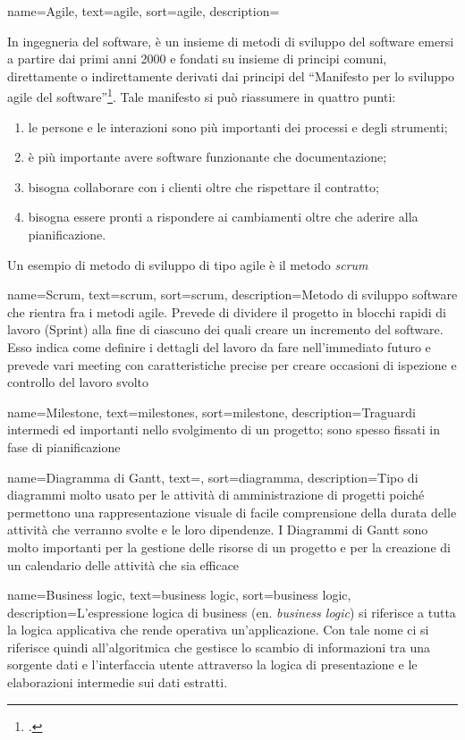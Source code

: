 {
    name=Agile,
    text=agile,
    sort=agile,
    description={In ingegneria del software, è un insieme di metodi di sviluppo del software emersi a partire dai primi anni 2000 e fondati su insieme di principi comuni, direttamente o indirettamente derivati dai principi del ``Manifesto per lo sviluppo agile del software''\footcite{manifesto}. Tale manifesto si può riassumere in quattro punti:
        \begin{enumerate}
            \item le persone e le interazioni sono più importanti dei processi e degli strumenti;
            \item è più importante avere software funzionante che documentazione;
            \item bisogna collaborare con i clienti oltre che rispettare il contratto;
            \item bisogna essere pronti a rispondere ai cambiamenti oltre che aderire alla pianificazione.
        \end{enumerate}
    Un esempio di metodo di sviluppo di tipo agile è il metodo \emph{\gls{scrum}}\glsfirstoccur}
}

{
    name=Scrum,
    text=scrum,
    sort=scrum,
    description={Metodo di sviluppo software che rientra fra i metodi agile. Prevede di dividere il progetto in blocchi rapidi di lavoro (Sprint) alla fine di ciascuno dei quali creare un incremento del software. Esso indica come definire i dettagli del lavoro da fare nell'immediato futuro e prevede vari meeting con caratteristiche precise per creare occasioni di ispezione e controllo del lavoro svolto}
}

{
    name=Milestone,
    text=milestones,
    sort=milestone,
    description={Traguardi intermedi ed importanti nello svolgimento di un progetto; sono spesso fissati in fase di pianificazione}
}

{
    name=Diagramma di Gantt,
    text=,
    sort=diagramma,
    description={Tipo di diagrammi molto usato per le attività di amministrazione di progetti poiché
        permettono una rappresentazione visuale di facile comprensione della durata delle attività
        che verranno svolte e le loro dipendenze. I Diagrammi di Gantt sono molto importanti
        per la gestione delle risorse di un progetto e per la creazione di un calendario delle attività
        che sia efficace}
}

{
    name=Business logic,
    text=business logic,
    sort=business logic,
    description={L'espressione logica di business (en. \textit{business logic}) si riferisce a tutta la logica applicativa che rende operativa un'applicazione. Con tale nome ci si riferisce quindi all'algoritmica che gestisce lo scambio di informazioni tra una sorgente dati e l'interfaccia utente attraverso la logica di presentazione e le elaborazioni intermedie sui dati estratti.
}}

